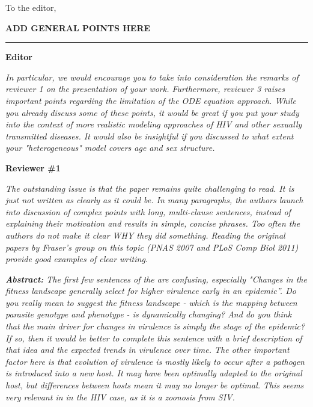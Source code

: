 \documentclass[10pt]{letter}
\newcommand{\revcomment}[1]{\emph{#1}}
\newcommand{\response}[1]{#1}
\begin{document}
\date{\today}

\signature{\texttt{[image: bbsig3.png]}\\Benjamin Bolker}

\begin{letter}{
} 

\opening{To the editor,}

\textbf{ADD GENERAL POINTS HERE}

\vskip10pt
\hrule

\textbf{Editor}

\revcomment{
In particular, we would encourage you to take into consideration the remarks of reviewer 1 on the presentation of your work. Furthermore, reviewer 3 raises important points regarding the limitation of the ODE equation approach. While you already discuss some of these points, it would be great if you put your study into the context of more realistic modeling approaches of HIV and other sexually transmitted diseases. It would also be insightful if you discussed to what extent your "heterogeneous" model covers age and sex structure.
}

\textbf{Reviewer \#1}

\revcomment{
The outstanding issue is that the paper remains quite challenging to
read. It is just not written as clearly as it could be. In many
paragraphs, the authors launch into discussion of complex points with
long, multi-clause sentences, instead of explaining their motivation
and results in simple, concise phrases. Too often the authors do not
make it clear WHY they did something. Reading the original papers by
Fraser’s group on this topic (PNAS 2007 and PLoS Comp Biol 2011)
provide good examples of clear writing.
}

\revcomment{
\textbf{Abstract:} The first few sentences of the are confusing,
especially "Changes in the fitness landscape generally select for
higher virulence early in an epidemic”. Do you really mean to suggest
the fitness landscape - which is the mapping between parasite genotype
and phenotype - is dynamically changing? And do you think that the
main driver for changes in virulence is simply the stage of the
epidemic? If so, then it would be better to complete this sentence
with a brief description of that idea and the expected trends in
virulence over time. The other important factor here is that evolution
of virulence is mostly likely to occur after a pathogen is introduced
into a new host. It may have been optimally adapted to the original
host, but differences between hosts mean it may no longer be
optimal. This seems very relevant in in the HIV case, as it is a
zoonosis from SIV.
}


\end{letter}
\end{document}

